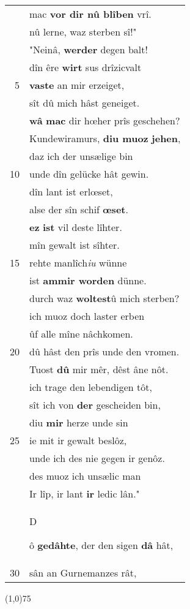\documentclass[8pt,a4paper,notitlepage]{article}
\begin{document}
\begin{table}[ht]
\begin{minipage}[t]{0.5\linewidth}
\begin{tabular}{rl}
 & mac \textbf{vor dir nû blîben} vrî.\\ 
 & nû lerne, waz sterben sî!"\\ 
 & "Neinâ, \textbf{werder} degen balt!\\ 
 & dîn êre \textbf{wirt} sus drîzicvalt\\ 
5 & \textbf{vaste} an mir erzeiget,\\ 
 & sît dû mich hâst geneiget.\\ 
 & \textbf{wâ} \textbf{mac} dir hœher prîs geschehen?\\ 
 & Kundewiramurs, \textbf{diu muoz} \textbf{jehen},\\ 
 & daz ich der unsælige bin\\ 
10 & unde dîn gelücke hât gewin.\\ 
 & dîn lant ist erlœset,\\ 
 & alse der sîn schif \textbf{œset}.\\ 
 & \textbf{ez} \textbf{ist} vil deste lîhter.\\ 
 & mîn gewalt ist sîhter.\\ 
15 & rehte manlîch\textit{iu} wünne\\ 
 & ist \textbf{ammir worden} dünne.\\ 
 & durch waz \textbf{woltest}û mich sterben?\\ 
 & ich muoz doch laster erben\\ 
 & ûf alle mîne nâchkomen.\\ 
20 & dû hâst den prîs unde den vromen.\\ 
 & Tuost \textbf{dû} mir mêr, dêst âne nôt.\\ 
 & ich trage den lebendigen tôt,\\ 
 & sît ich von \textbf{der} gescheiden bin,\\ 
 & diu \textbf{mir} herze unde sin\\ 
25 & ie mit ir gewalt beslôz,\\ 
 & unde ich des nie gegen ir genôz.\\ 
 & des muoz ich unsælic man\\ 
 & Ir lîp, ir lant \textbf{ir} ledic lân."\\ 
 & \begin{large}D\end{large}ô \textbf{gedâhte}, der den sigen \textbf{dâ} hât,\\ 
30 & sân an Gurnemanzes rât,\\ 
\end{tabular}
\scriptsize
\line(1,0){75} \newline

\end{minipage}
\end{table}
\end{document}
